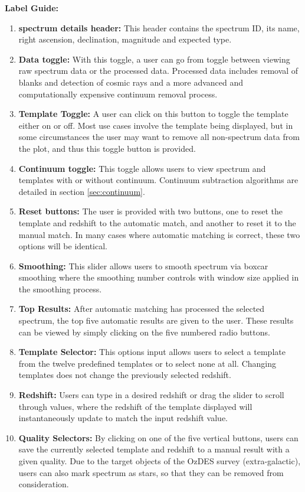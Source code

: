 \documentclass[titlesmallcaps, examinerscopy, copyrightpage]{uqthesis}
\begin{document}
\textbf{Label Guide:}
\begin{enumerate}
\item \textbf{spectrum details header:} This header contains the spectrum ID, its name, right ascension, declination, magnitude and expected type.
\item \textbf{Data toggle:} With this toggle, a user can go from toggle between viewing raw spectrum data or the processed data. Processed data includes removal of blanks and detection of cosmic rays and a more advanced and computationally expensive continuum removal process.
\item \textbf{Template Toggle:} A user can click on this button to toggle the template either on or off. Most use cases involve the template being displayed, but in some circumstances the user may want to remove all non-spectrum data from the plot, and thus this toggle button is provided.
\item \textbf{Continuum toggle:} This toggle allows users to view spectrum and templates with or without continuum. Continuum subtraction algorithms are detailed in section \ref{sec:continuum}.
\item \textbf{Reset buttons:} The user is provided with two buttons, one to reset the template and redshift to the automatic match, and another to reset it to the manual match. In many cases where automatic matching is correct, these two options will be identical.
\item \textbf{Smoothing:} This slider allows users to smooth spectrum via boxcar smoothing where the smoothing number controls with window size applied in the smoothing process.
\item \textbf{Top Results:} After automatic matching has processed the selected spectrum, the top five automatic results are given to the user. These results can be viewed by simply clicking on the five numbered radio buttons.
\item \textbf{Template Selector:} This options input allows users to select a template from the twelve predefined templates or to select none at all. Changing templates does not change the previously selected redshift.
\item \textbf{Redshift:} Users can type in a desired redshift or drag the slider to scroll through values, where the redshift of the template displayed will instantaneously update to match the input redshift value.
\item \textbf{Quality Selectors:} By clicking on one of the five vertical buttons, users can save the currently selected template and redshift to a manual result with a given quality. Due to the target objects of the OzDES survey (extra-galactic), users can also mark spectrum as stars, so that they can be removed from consideration.

\end{enumerate}
\end{document}
